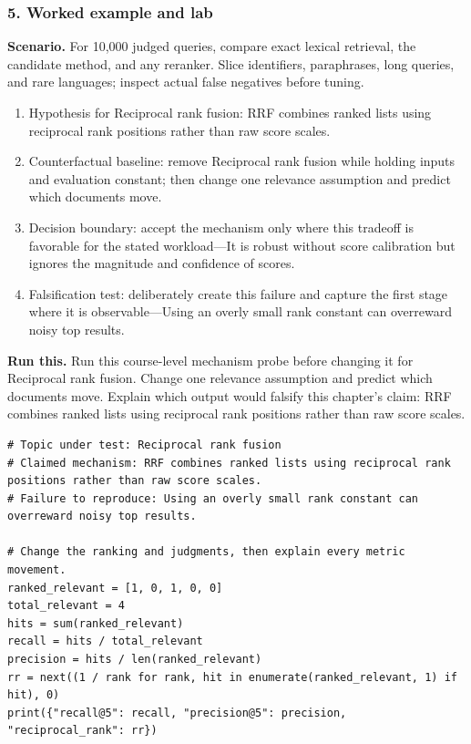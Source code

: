 \subsubsection*{5. Worked example and lab}
\textbf{Scenario.} For 10,000 judged queries, compare exact lexical retrieval, the candidate method, and any reranker. Slice identifiers, paraphrases, long queries, and rare languages; inspect actual false negatives before tuning.
\begin{enumerate}
\item Hypothesis for Reciprocal rank fusion: RRF combines ranked lists using reciprocal rank positions rather than raw score scales.
\item Counterfactual baseline: remove Reciprocal rank fusion while holding inputs and evaluation constant; then change one relevance assumption and predict which documents move.
\item Decision boundary: accept the mechanism only where this tradeoff is favorable for the stated workload—It is robust without score calibration but ignores the magnitude and confidence of scores.
\item Falsification test: deliberately create this failure and capture the first stage where it is observable—Using an overly small rank constant can overreward noisy top results.
\end{enumerate}
\textbf{Run this.} Run this course-level mechanism probe before changing it for Reciprocal rank fusion. Change one relevance assumption and predict which documents move. Explain which output would falsify this chapter's claim: RRF combines ranked lists using reciprocal rank positions rather than raw score scales.
\begin{Verbatim}[fontsize=\scriptsize]
# Topic under test: Reciprocal rank fusion
# Claimed mechanism: RRF combines ranked lists using reciprocal rank positions rather than raw score scales.
# Failure to reproduce: Using an overly small rank constant can overreward noisy top results.

# Change the ranking and judgments, then explain every metric movement.
ranked_relevant = [1, 0, 1, 0, 0]
total_relevant = 4
hits = sum(ranked_relevant)
recall = hits / total_relevant
precision = hits / len(ranked_relevant)
rr = next((1 / rank for rank, hit in enumerate(ranked_relevant, 1) if hit), 0)
print({"recall@5": recall, "precision@5": precision, "reciprocal_rank": rr})
\end{Verbatim}
